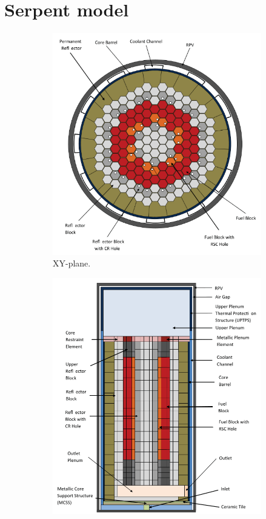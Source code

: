 \documentclass[11pt,letterpaper]{article}
\begin{document}
\section{Serpent model}

	\begin{figure}[]
		\centering
		\begin{subfigure}[t]{0.4\textwidth}
			\centering
			\includegraphics[width=\linewidth]{figures/radial-layout.png}
			\caption{XY-plane.}
		\end{subfigure}
		\begin{subfigure}[t]{0.4\textwidth}
			\centering
			\includegraphics[width=\linewidth]{figures/axial-layout.png}

\end{subfigure}
\end{figure}
\end{document}
